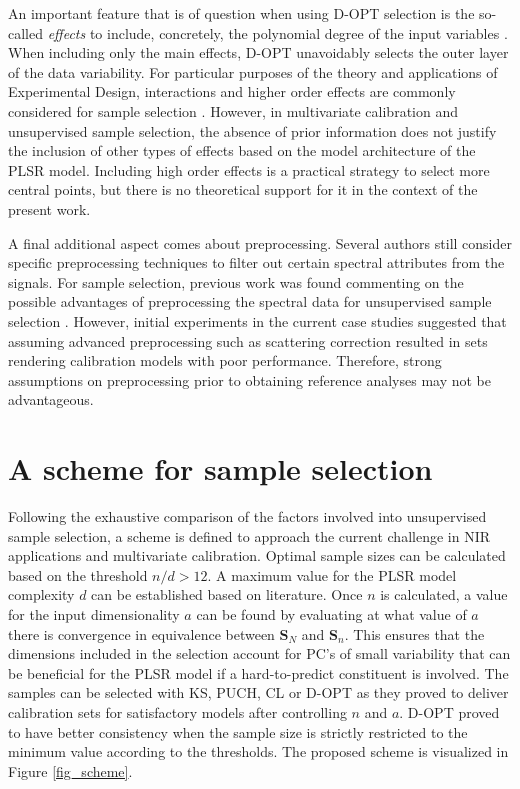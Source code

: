 \documentclass[journal=ancham,manuscript=article]{achemso}
\begin{document}
An important feature that is of question when using D-OPT selection is the so-called \emph{effects} to include, concretely, the polynomial degree of the input variables \cite{Goos2011}. When including only the main effects, D-OPT unavoidably selects the outer layer of the data variability. For particular purposes of the theory and applications of Experimental Design, interactions and higher order effects are commonly considered for sample selection \cite{Brandmaier2012}. However, in multivariate calibration and unsupervised sample selection, the absence of prior information does not justify the inclusion of other types of effects based on the model architecture of the PLSR model. Including high order effects is a practical strategy to select more central points, but there is no theoretical support for it in the context of the present work.

A final additional aspect comes about preprocessing. Several authors still consider specific preprocessing techniques to filter out certain spectral attributes from the signals. For sample selection, previous work was found commenting on the possible advantages of preprocessing the spectral data for unsupervised sample selection \cite{Liu2019}. However, initial experiments in the current case studies suggested that assuming advanced preprocessing such as scattering correction resulted in sets rendering calibration models with poor performance. Therefore, strong assumptions on preprocessing prior to obtaining reference analyses may not be advantageous.



\section*{A scheme for sample selection}\label{scheme}

Following the exhaustive comparison of the factors involved into unsupervised sample selection, a scheme is defined to approach the current challenge in NIR applications and multivariate calibration. Optimal sample sizes can be calculated based on the threshold $n/d>12$. A maximum value for the PLSR model complexity $d$ can be established based on literature. Once $n$ is calculated, a value for the input dimensionality $a$ can be found by evaluating at what value of $a$ there is convergence in equivalence between $\mathbf{S}_N$ and $\mathbf{S}_n$. This ensures that the dimensions included in the selection account for PC's of small variability that can be beneficial for the PLSR model if a hard-to-predict constituent is involved. The samples can be selected with KS, PUCH, CL or D-OPT as they proved to deliver calibration sets for satisfactory models after controlling $n$ and $a$. D-OPT proved to have better consistency when the sample size is strictly restricted to the minimum value according to the thresholds. The proposed scheme is visualized in Figure \ref{fig_scheme}.
\end{document}
